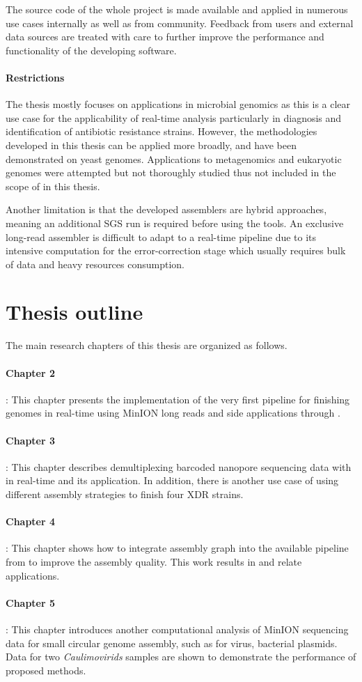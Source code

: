 The source code of the whole project is made available and applied in numerous use cases internally as well as from community. Feedback from users and external data sources are treated with care to further improve the performance and functionality of the developing software. 

\paragraph{Restrictions}
The thesis mostly focuses on applications in microbial genomics as this is a clear use case for the applicability of real-time analysis particularly in diagnosis and identification of antibiotic resistance strains.  However, the methodologies developed in this thesis can be applied more broadly, and have been demonstrated on yeast genomes. Applications to metagenomics and eukaryotic genomes were attempted but not thoroughly studied thus not included in the scope of in this thesis.

Another limitation is that the developed assemblers are hybrid approaches, meaning an additional SGS run is required before using the tools. An exclusive long-read assembler is difficult to adapt to a real-time pipeline due to its intensive computation for the error-correction stage which usually requires bulk of data and heavy resources consumption.
\section{Thesis outline}
The main research chapters of this thesis are organized as follows.
\paragraph{Chapter 2}: 
This chapter presents the implementation of the very first pipeline for finishing genomes in real-time using MinION long reads and side applications through \npscarf{}.
\paragraph{Chapter 3}:
This chapter describes demultiplexing barcoded nanopore sequencing data with \npbarcode{} in real-time and its application. In addition, there is another use case of using different assembly strategies to finish four XDR \kp{} strains.
\paragraph{Chapter 4}: 
This chapter shows how to integrate assembly graph into the available pipeline from \npscarf{} to improve the assembly quality. This work results in \npgraph{} and relate applications.
\paragraph{Chapter 5}: 
This chapter introduces another computational analysis of MinION sequencing data for small circular genome assembly, such as for virus, bacterial plasmids. Data for two \emph{Caulimovirids} samples are shown to demonstrate the performance of proposed methods.